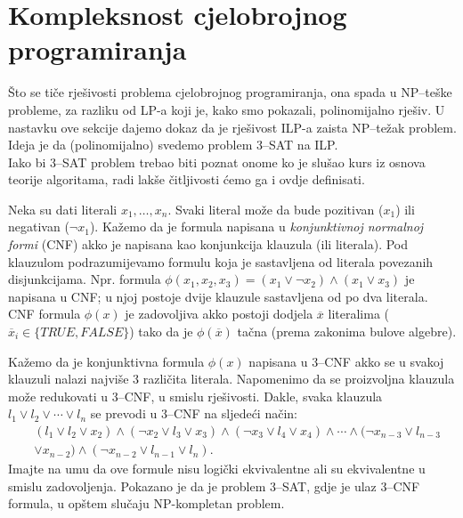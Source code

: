\documentclass[a4paper, utf8, 11pt, colorlinks]{book}
\begin{document}
 \section{Kompleksnost cjelobrojnog programiranja}
   Što se tiče rješivosti problema cjelobrojnog programiranja, ona spada u NP--teške probleme, za razliku od LP-a koji je, kako smo pokazali, polinomijalno rješiv. U nastavku ove sekcije dajemo dokaz da je rješivost ILP-a zaista NP--težak problem.  Ideja je da (polinomijalno) svedemo problem 3--SAT na ILP.\\ 
   Iako bi 3--SAT problem trebao biti poznat onome ko je slušao kurs iz osnova teorije algoritama, radi lakše čitljivosti ćemo ga i ovdje definisati. 
   
   Neka su dati literali $x_1, \ldots, x_n$. Svaki literal može da bude pozitivan ($x_1$) ili negativan  ($\neg x_1$). Kažemo da je formula napisana u \emph{konjunktivnoj normalnoj formi} (CNF) akko je napisana kao konjunkcija klauzula (ili literala). Pod klauzulom podrazumijevamo formulu koja je sastavljena od literala povezanih disjunkcijama. Npr. formula $\phi(x_1, x_2, x_3)= (x_1 \vee  \neg x_2) \wedge (x_1 \vee x_3)$ je napisana u CNF; u njoj postoje dvije klauzule sastavljena od po dva literala. CNF formula $\phi(x)$ je zadovoljiva akko postoji dodjela $\overline{x}$ literalima ($\overline{x}_i \in \{TRUE, FALSE\}$) tako da je $\phi(\overline{x})$ tačna (prema zakonima bulove algebre).  
   
   Kažemo da je konjunktivna formula $\phi(x)$  napisana u 3--CNF  akko se u svakoj klauzuli nalazi najviše 3 različita literala. Napomenimo da se proizvoljna klauzula može redukovati u 3--CNF, u smislu rješivosti. Dakle, svaka klauzula 
   $l_1 \vee l_2 \vee \cdots \vee l_n$ se prevodi u 3--CNF na sljedeći način:
   \begin{align*}
       &(l_1 \vee l_2 \vee x_2) \wedge ( \neg x_2 \vee l_3 \vee x_3) \wedge ( \neg x_3 \vee l_4 \vee x_4 ) \wedge \cdots \wedge (\neg x_{n-3} \vee l_{n-3} \\
       &\vee x_{n-2} ) \wedge ( \neg x_{n-2} \vee l_{n-1} \vee l_n ).  
    \end{align*}    
      Imajte na umu da ove formule nisu logički ekvivalentne ali su ekvivalentne u smislu zadovoljenja. 
    Pokazano je da je problem 3--SAT, gdje je ulaz 3--CNF formula,  u opštem slučaju NP-kompletan problem.  
    
\end{document}
